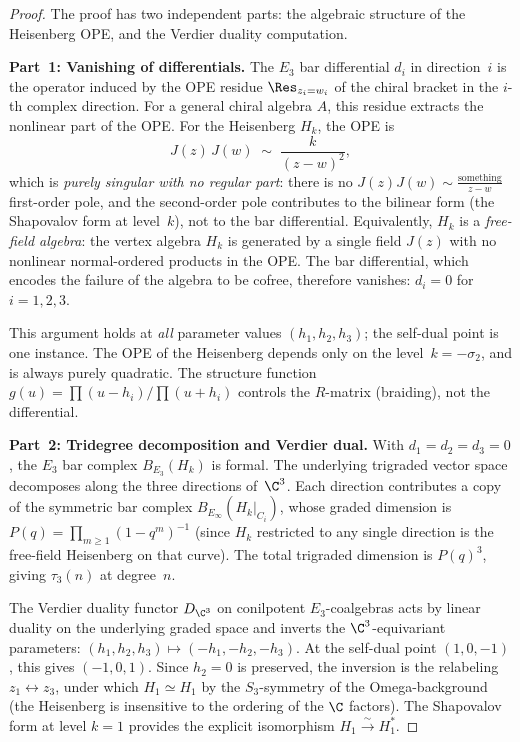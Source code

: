 \begin{proof}
 The proof has two independent parts: the algebraic structure of the Heisenberg OPE, and the Verdier duality computation.

\medskip
\noindent\textbf{Part~1: Vanishing of differentials.}
The $E_3$ bar differential $d_i$ in direction~$i$ is the operator induced by the OPE residue $\Res_{z_i = w_i}$ of the chiral bracket in the $i$-th complex direction. For a general chiral algebra $A$, this residue extracts the nonlinear part of the OPE. For the Heisenberg $H_k$, the OPE is
\[
 J(z) \, J(w) \;\sim\; \frac{k}{(z-w)^2},
\]
which is \emph{purely singular with no regular part}: there is no $J(z)J(w) \sim \frac{\text{something}}{z-w}$ first-order pole, and the second-order pole contributes to the bilinear form (the Shapovalov form at level~$k$), not to the bar differential. Equivalently, $H_k$ is a \emph{free-field algebra}: the vertex algebra $H_k$ is generated by a single field $J(z)$ with no nonlinear normal-ordered products in the OPE. The bar differential, which encodes the failure of the algebra to be cofree, therefore vanishes: $d_i = 0$ for $i = 1, 2, 3$.

This argument holds at \emph{all} parameter values $(h_1, h_2, h_3)$; the self-dual point is one instance. The OPE of the Heisenberg depends only on the level~$k = -\sigma_2$, and is always purely quadratic. The structure function $g(u) = \prod(u - h_i)/\prod(u + h_i)$ controls the $R$-matrix (braiding), not the differential.

\medskip
\noindent\textbf{Part~2: Tridegree decomposition and Verdier dual.}
With $d_1 = d_2 = d_3 = 0$, the $E_3$ bar complex $B_{E_3}(H_k)$ is formal. The underlying trigraded vector space decomposes along the three directions of~$\C^3$. Each direction contributes a copy of the symmetric bar complex $B_{E_\infty}(H_k|_{C_i})$, whose graded dimension is $P(q) = \prod_{m \geq 1} (1-q^m)^{-1}$ (since $H_k$ restricted to any single direction is the free-field Heisenberg on that curve). The total trigraded dimension is $P(q)^3$, giving $\tau_3(n)$ at degree~$n$.

The Verdier duality functor $D_{\C^3}$ on conilpotent $E_3$-coalgebras acts by linear duality on the underlying graded space and inverts the $\C^3$-equivariant parameters: $(h_1, h_2, h_3) \mapsto (-h_1, -h_2, -h_3)$. At the self-dual point $(1, 0, -1)$, this gives $(-1, 0, 1)$. Since $h_2 = 0$ is preserved, the inversion is the relabeling $z_1 \leftrightarrow z_3$, under which $H_1 \simeq H_1$ by the $S_3$-symmetry of the Omega-background (the Heisenberg is insensitive to the ordering of the $\C$ factors). The Shapovalov form at level $k = 1$ provides the explicit isomorphism $H_1 \xrightarrow{\sim} H_1^*$.
\end{proof}


